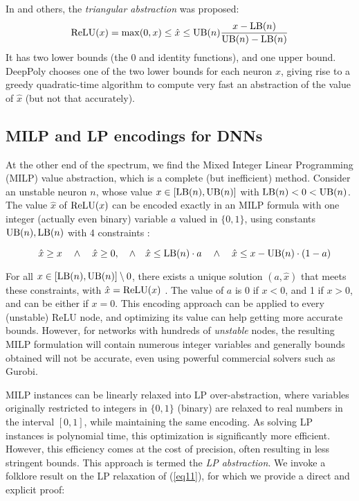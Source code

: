 In \cite{DBLP_Ehlers17,deeppoly} and others, the {\em triangular abstraction} was proposed:
\begin{align}
	\mathrm{ReLU}(x) = \max (0,x) \leq \hat{x} \leq \mathrm{UB}(n) \frac{x-\mathrm{LB}(n)}{\mathrm{UB}(n)-\mathrm{LB}(n)} 
	\label{eq:deeppoly}
\end{align} 
It has two lower bounds (the 0 and identity functions), and one upper bound. 
DeepPoly \cite{deeppoly} chooses one of the two lower bounds for each neuron $x$, giving rise to a greedy quadratic-time algorithm to compute very fast an abstraction of the value of $\hat{x}$ (but not that accurately).




\subsection{MILP and LP encodings for DNNs}

At the other end of the spectrum, we find the Mixed Integer Linear Programming (MILP) value abstraction, which is a complete (but inefficient) method. 
Consider an unstable neuron $n$, whose value $x \in [\mathrm{LB}(n),\mathrm{UB}(n)]$ with $\mathrm{LB}(n)<0<\mathrm{UB}(n)$.
The value $\hat{x}$ of $\mathrm{ReLU}(x)$ can be encoded exactly in an MILP formula with one 
integer (actually even binary) variable $a$ valued in $\{0,1\}$, using constants $\mathrm{UB}(n),\mathrm{LB}(n)$ with 4 constraints \cite{MILP}:

\vspace{-0.4cm}
\begin{equation}\quad \hat{x} \geq x \quad \wedge \quad \hat{x} \geq 0, \quad \wedge \quad \hat{x} \leq \mathrm{LB}(n) \cdot a \quad \wedge \quad \hat{x} \leq x-\mathrm{UB}(n) \cdot (1-a)
\label{eq11}
\end{equation}

For all $x \in [\mathrm{LB}(n),\mathrm{UB}(n)] \setminus 0$, there exists a unique solution $(a,\hat{x})$ that meets these constraints, with $\hat{x}=\mathrm{ReLU}(x)$ \cite{MILP}. The value of $a$ is 0 if $x < 0$, and 1 if $x>0$, and can be either if $x=0$. This encoding approach can be applied to every (unstable) ReLU node, and optimizing its value can help getting more accurate bounds. However, for networks with hundreds of {\em unstable} nodes, the resulting MILP formulation will contain numerous integer variables and generally bounds obtained will not be accurate, even using powerful commercial solvers such as Gurobi.

MILP instances can be linearly relaxed into LP over-abstraction, where variables originally restricted to integers in $\{0,1\}$ (binary) are relaxed to real numbers in the interval $[0,1]$, while maintaining the same encoding. As solving LP instances is polynomial time, this optimization is significantly more efficient. However, this efficiency comes at the cost of precision, often resulting in less stringent bounds. This approach is termed the {\em LP abstraction}. We invoke a folklore result on the LP relaxation of (\ref{eq11}), for which we provide a direct and explicit proof:

